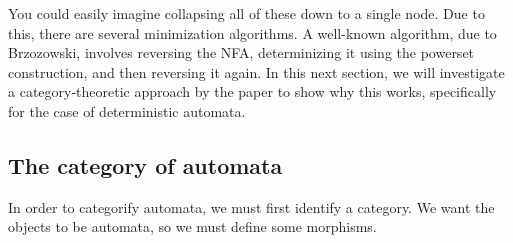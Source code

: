 \begin{figure}[h]
\centering
{}
\end{figure}

You could easily imagine collapsing all of these down to a single node.
Due to this, there are several minimization algorithms.
A well-known algorithm, due to Brzozowski, involves reversing the NFA, determinizing it using the powerset construction, and then reversing it again.
In this next section, we will investigate a category-theoretic approach by the paper\cite{bonchiAlgebracoalgebraDualityBrzozowskis2014} to show why this works, specifically for the case of deterministic automata.

\subsection{The category of automata}

In order to categorify automata, we must first identify a category.
We want the objects to be automata, so we must define some morphisms.

